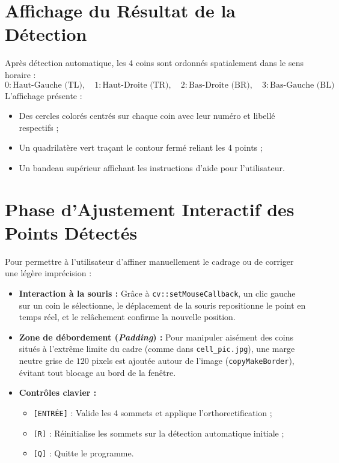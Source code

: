 \documentclass[a4paper,11pt]{article}
\begin{document}
\section{Affichage du Résultat de la Détection}

Après détection automatique, les 4 coins sont ordonnés spatialement dans le sens horaire :
\begin{equation*}
    0 : \text{Haut-Gauche (TL)}, \quad 1 : \text{Haut-Droite (TR)}, \quad 2 : \text{Bas-Droite (BR)}, \quad 3 : \text{Bas-Gauche (BL)}
\end{equation*}
L'affichage présente :
\begin{itemize}
    \item Des cercles colorés centrés sur chaque coin avec leur numéro et libellé respectifs ;
    \item Un quadrilatère vert traçant le contour fermé reliant les 4 points ;
    \item Un bandeau supérieur affichant les instructions d'aide pour l'utilisateur.
\end{itemize}

\section{Phase d'Ajustement Interactif des Points Détectés}

Pour permettre à l'utilisateur d'affiner manuellement le cadrage ou de corriger une légère imprécision :
\begin{itemize}
    \item \textbf{Interaction à la souris :} Grâce à \texttt{cv::setMouseCallback}, un clic gauche sur un coin le sélectionne, le déplacement de la souris repositionne le point en temps réel, et le relâchement confirme la nouvelle position.
    \item \textbf{Zone de débordement (\textit{Padding}) :} Pour manipuler aisément des coins situés à l'extrême limite du cadre (comme dans \texttt{cell\_pic.jpg}), une marge neutre grise de $120$ pixels est ajoutée autour de l'image (\texttt{copyMakeBorder}), évitant tout blocage au bord de la fenêtre.
    \item \textbf{Contrôles clavier :}
    \begin{itemize}
        \item \texttt{[ENTRÉE]} : Valide les 4 sommets et applique l'orthorectification ;
        \item \texttt{[R]} : Réinitialise les sommets sur la détection automatique initiale ;
        \item \texttt{[Q]} : Quitte le programme.
    \end{itemize}
\end{itemize}
\end{document}
